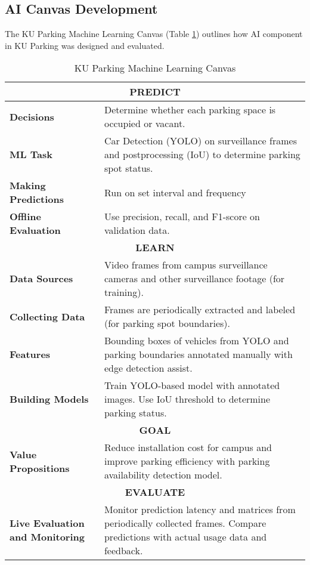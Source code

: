 \subsection{AI Canvas Development}
\label{subsection:ai-canvas-development}
The KU Parking Machine Learning Canvas (Table \ref{tab:ml-canvas}) outlines how AI component in KU Parking was designed and evaluated.

\begin{table}[H]
\centering
\caption{KU Parking Machine Learning Canvas}
\label{tab:ml-canvas}
\begin{tabular}{|p{4cm}|p{10cm}|}
\hline
\multicolumn{2}{|c|}{\cellcolor{cyan!15}\textbf{PREDICT}} \\ \hline
\textbf{Decisions} & Determine whether each parking space is occupied or vacant.\\ \hline
\textbf{ML Task} & Car Detection (YOLO) on surveillance frames and postprocessing (IoU) to determine parking spot status.\\ \hline
\textbf{Making Predictions} & Run on set interval and frequency\\ \hline
\textbf{Offline Evaluation} & Use precision, recall, and F1-score on validation data. \\ \hline

\multicolumn{2}{|c|}{\cellcolor{yellow!15}\textbf{LEARN}} \\ \hline
\textbf{Data Sources} & Video frames from campus surveillance cameras and other surveillance footage (for training). \\ \hline
\textbf{Collecting Data} & Frames are periodically extracted and labeled (for parking spot boundaries). \\ \hline
\textbf{Features} & Bounding boxes of vehicles from YOLO and parking boundaries annotated manually with edge detection assist. \\ \hline
\textbf{Building Models} & Train YOLO-based model with annotated images. Use IoU threshold to determine parking status. \\ \hline

\multicolumn{2}{|c|}{\textbf{GOAL}} \\ \hline\textbf{Value Propositions} & Reduce installation cost for campus and improve parking efficiency with parking availability detection model. \\ \hline

\multicolumn{2}{|c|}{\cellcolor{purple!15}\textbf{EVALUATE}} \\ \hline
\textbf{Live Evaluation and Monitoring} & Monitor prediction latency and matrices from periodically collected frames. Compare predictions with actual usage data and feedback. \\ \hline

\end{tabular}
\end{table}

